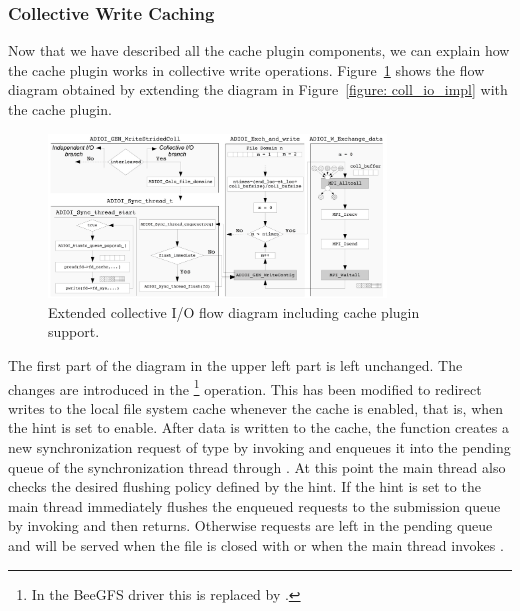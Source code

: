 \subsubsection{Collective Write Caching}
Now that we have described all the cache plugin components, we can explain how the cache plugin works in collective write operations. Figure~\ref{figure: coll_io_cache} shows the flow diagram
obtained by extending the diagram in Figure~\ref{figure: coll_io_impl} with the cache plugin. 
\begin{figure}[H]
  \centering
  \includegraphics[angle=90,width=0.8\textwidth]{figures/ext2ph+e10_t}
  \caption{Extended collective I/O flow diagram including cache plugin support.}
  \label{figure: coll_io_cache}
\end{figure}
The first part of the diagram in the upper left part is left unchanged. The changes are introduced in the \footnote{In the BeeGFS driver this is replaced by 
.} operation. This has been modified to redirect writes to the local file system cache whenever the cache is enabled, that is, when the  
hint is set to enable. After data is written to the cache, the function creates a new synchronization request of type  by invoking  
and enqueues it into the pending queue of the synchronization thread through . At this point the main thread also checks the desired flushing policy defined by 
the  hint. If the hint is set to  the main thread immediately flushes the enqueued requests to the submission queue by invoking 
 and then returns. Otherwise requests are left in the pending queue and will be served when the file is closed with  or when the 
main thread invokes .

